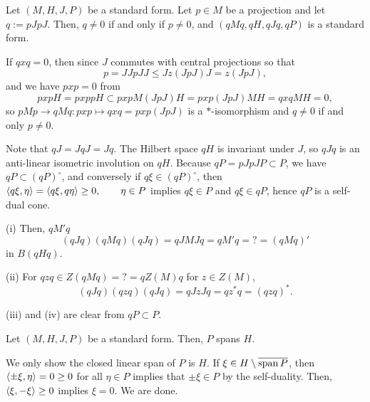 \documentclass{../../../small}
\begin{document}
\begin{lem}
Let $(M,H,J,P)$ be a standard form.
Let $p\in M$ be a projection and let $q:=pJpJ$.
Then, $q\ne0$ if and only if $p\ne0$, and $(qMq,qH,qJq,qP)$ is a standard form.
\end{lem}
\begin{pf}
If $qxq=0$, then since $J$ commutes with central projections so that
\[p=JJpJJ\le Jz(JpJ)J=z(JpJ),\]
and we have $pxp=0$ from
\[pxpH=pxppH\subset pxpM(JpJ)H=pxp(JpJ)MH=qxqMH=0,\]
so $pMp\to qMq:pxp\mapsto qxq=pxp(JpJ)$ is a $*$-isomorphism and $q\ne0$ if and only $p\ne0$.

Note that $qJ=JqJ=Jq$.
The Hilbert space $qH$ is invariant under $J$, so $qJq$ is an anti-linear isometric involution on $qH$.
Because $qP=pJpJP\subset P$, we have $qP\subset(qP)^\circ$, and conversely if $q\xi\in(qP)^\circ$, then $\langle q\xi,\eta\rangle=\langle q\xi,q\eta\rangle\ge0,\qquad\eta\in P$ implies $q\xi\in P$ and $q\xi\in qP$, hence $qP$ is a self-dual cone.

(i)
Then, $qM'q$
\[(qJq)(qMq)(qJq)=qJMJq=qM'q=?=(qMq)'\]
in $B(qHq)$.

(ii)
For $qzq\in Z(qMq)=?=qZ(M)q$ for $z\in Z(M)$,
\[(qJq)(qzq)(qJq)=qJzJq=qz^*q=(qzq)^*.\]

(iii) and (iv) are clear from $qP\subset P$.
\end{pf}

\begin{lem}
Let $(M,H,J,P)$ be a standard form.
Then, $P$ spans $H$.
\end{lem}
\begin{pf}
We only show the closed linear span of $P$ is $H$.
If $\xi\in H\setminus\overline{\operatorname{span} P}$, then $\langle\pm\xi,\eta\rangle=0\ge0$ for all $\eta\in P$ implies that $\pm\xi\in P$ by the self-duality.
Then, $\langle\xi,-\xi\rangle\ge0$ implies $\xi=0$.
We are done.
\end{pf}
\end{document}
